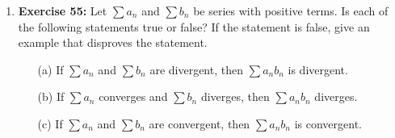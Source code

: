 \documentclass{article}
\begin{document}
\begin{enumerate}
    \item \textbf{Exercise 55:} Let $\sum a_n$ and $\sum b_n$ be series with positive terms. Is each of the following statements true or false? If the statement is false, give an example that disproves the statement.
    \begin{enumerate}
        \item[(a)] If $\sum a_n$ and $\sum b_n$ are divergent, then $\sum a_n b_n$ is divergent.
        \item[(b)] If $\sum a_n$ converges and $\sum b_n$ diverges, then $\sum a_n b_n$ diverges.
        \item[(c)] If $\sum a_n$ and $\sum b_n$ are convergent, then $\sum a_n b_n$ is convergent.
    \end{enumerate}
\end{enumerate}
\end{document}
